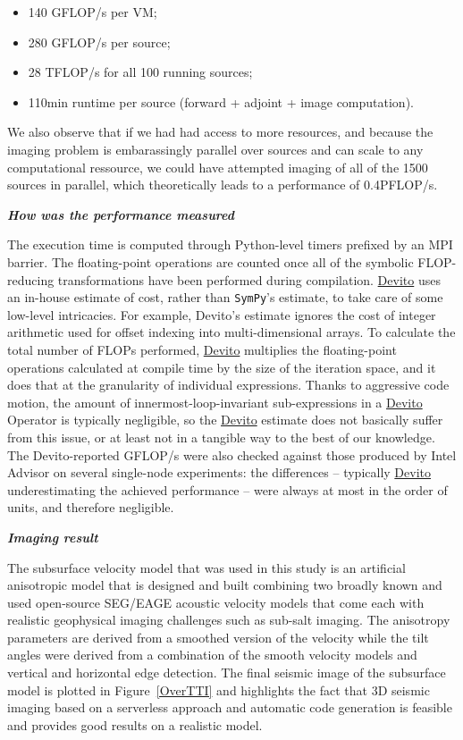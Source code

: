 \documentclass[conference]{IEEEtran}
\begin{document}
\begin{itemize}
\itemsep1pt\parskip0pt
\item
  140 GFLOP/s per VM;
\item
  280 GFLOP/s per source;
\item
  28 TFLOP/s for all 100 running sources;
\item
  110min runtime per source (forward + adjoint + image computation).
\end{itemize}

We also observe that if we had had access to more resources, and because
the imaging problem is embarassingly parallel over sources and can scale
to any computational ressource, we could have attempted imaging of all
of the 1500 sources in parallel, which theoretically leads to a
performance of 0.4PFLOP/s.

\textbf{\emph{How was the performance measured}}

The execution time is computed through Python-level timers prefixed by
an MPI barrier. The floating-point operations are counted once all of
the symbolic FLOP-reducing transformations have been performed during
compilation. \href{https://github.com/devitocodes/devito}{Devito} uses
an in-house estimate of cost, rather than \texttt{SymPy}'s estimate, to
take care of some low-level intricacies. For example, Devito's estimate
ignores the cost of integer arithmetic used for offset indexing into
multi-dimensional arrays. To calculate the total number of FLOPs
performed, \href{https://github.com/devitocodes/devito}{Devito}
multiplies the floating-point operations calculated at compile time by
the size of the iteration space, and it does that at the granularity of
individual expressions. Thanks to aggressive code motion, the amount of
innermost-loop-invariant sub-expressions in a
\href{https://github.com/devitocodes/devito}{Devito} Operator is
typically negligible, so the
\href{https://github.com/devitocodes/devito}{Devito} estimate does not
basically suffer from this issue, or at least not in a tangible way to
the best of our knowledge. The Devito-reported GFLOP/s were also checked
against those produced by Intel Advisor on several single-node
experiments: the differences -- typically
\href{https://github.com/devitocodes/devito}{Devito} underestimating the
achieved performance -- were always at most in the order of units, and
therefore negligible.

\textbf{\emph{Imaging result}}

The subsurface velocity model that was used in this study is an
artificial anisotropic model that is designed and built combining two
broadly known and used open-source SEG/EAGE acoustic velocity models
that come each with realistic geophysical imaging challenges such as
sub-salt imaging. The anisotropy parameters are derived from a smoothed
version of the velocity while the tilt angles were derived from a
combination of the smooth velocity models and vertical and horizontal
edge detection. The final seismic image of the subsurface model is
plotted in Figure~\ref{OverTTI} and highlights the fact that 3D seismic
imaging based on a serverless approach and automatic code generation is
feasible and provides good results on a realistic model.
\end{document}
